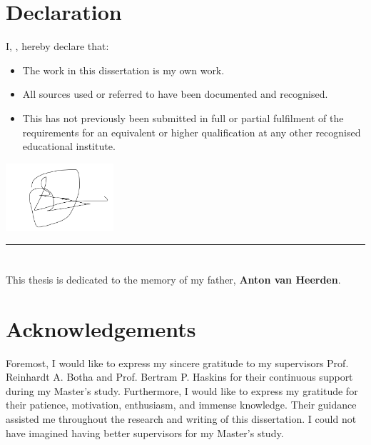 \chapter{Declaration}

I, \thethesisauthor, hereby declare that:

\begin{itemize}

\item The work in this dissertation is my own work.

\item All sources used or referred to have been documented and
recognised.

\item This \MakeLowercase{\thethesistype} has not previously been
submitted in full or partial fulfilment of the requirements for
an equivalent or higher qualification at any other recognised
educational institute.

\end{itemize}

\includegraphics[width=40mm]{./figures/signature}
\rule[0mm]{0mm}{40mm}

\rule[0mm]{70mm}{0.3mm}

\thethesisauthor

\chapter*{}
This thesis is dedicated to the memory of my father, \textbf{Anton van Heerden}.


\chapter{Acknowledgements}

Foremost, I would like to express my sincere gratitude to my supervisors Prof. Reinhardt A. Botha and Prof. Bertram P. Haskins for their continuous support during my Master's study. Furthermore, I would like to express my gratitude for their patience, motivation, enthusiasm, and immense knowledge. Their guidance assisted me throughout the research and writing of this dissertation. I could not have imagined having better supervisors for my Master's study.

